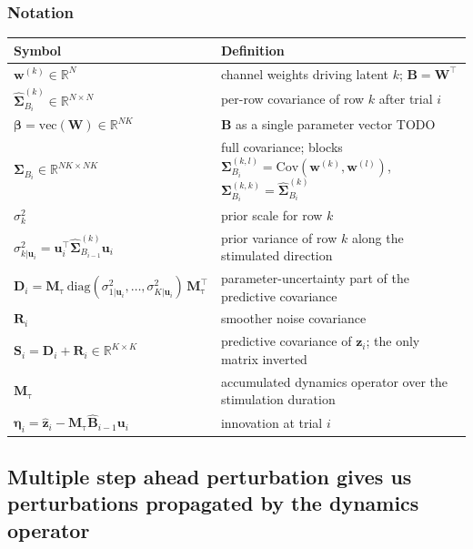 \documentclass[11pt,letterpaper]{article} %
\begin{document}
\subsubsection*{Notation}
\begin{center}
\begin{tabular}{ll}
    \hline
    Symbol & Definition \\
    \hline
    $\bm{w}^{(k)} \in \mathbb{R}^{N}$ & channel weights driving latent $k$; $\bm{B} = \bm{W}^\top$ \\
    $\hat{\bm{\Sigma}}_{B_i}^{(k)} \in \mathbb{R}^{N\times N}$ & per-row covariance of row $k$ after trial $i$ \\
    $\boldsymbol{\beta} = \mathrm{vec}(\bm{W}) \in \mathbb{R}^{NK}$ & $\bm{B}$ as a single parameter vector TODO\\
    $\bm{\Sigma}_{B_i} \in \mathbb{R}^{NK\times NK}$ & full covariance; blocks $\bm{\Sigma}_{B_i}^{(k,l)} = \mathrm{Cov}(\bm{w}^{(k)},\bm{w}^{(l)})$, $\bm{\Sigma}_{B_i}^{(k,k)} = \hat{\bm{\Sigma}}_{B_i}^{(k)}$ \\
    $\sigma_k^2$ & prior scale for row $k$ \\
    $\sigma^2_{k|\bm{u}_i} = \bm{u}_i^\top \hat{\bm{\Sigma}}_{B_{i-1}}^{(k)}\bm{u}_i$ & prior variance of row $k$ along the stimulated direction \\
    $\bm{D}_i = \bm{M}_{\mathrm{\tau}}\,\mathrm{diag}(\sigma^2_{1|\bm{u}_i},\dots,\sigma^2_{K|\bm{u}_i})\,\bm{M}_{\mathrm{\tau}}^\top$ & parameter-uncertainty part of the predictive covariance \\
    $\bm{R}_i$ & smoother noise covariance\\
    $\bm{S}_i = \bm{D}_i + \bm{R}_i \in \mathbb{R}^{K\times K}$ & predictive covariance of $\bm{z}_i$; the only matrix inverted \\
    $\bm{M}_{\mathrm{\tau}}$ & accumulated dynamics operator over the stimulation duration \\
    $\boldsymbol{\eta}_i = \hat{\bm{z}}_i - \bm{M}_{\mathrm{\tau}}\hat{\bm{B}}_{i-1}\bm{u}_i$ & innovation at trial $i$ \\
    \hline
\end{tabular}
\end{center}
\noindent
\clearpage
\subsection*{Multiple step ahead perturbation gives us perturbations propagated by the dynamics operator}
\end{document}
